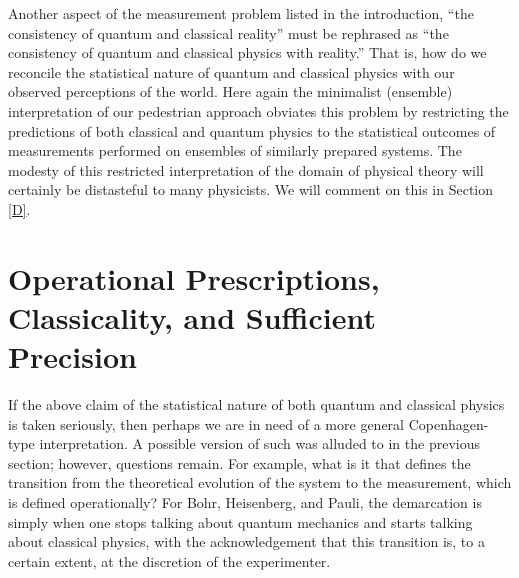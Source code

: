 \documentclass [12pt]{revtex4}
\begin{document}
Another aspect of the measurement problem listed in the
introduction, ``the consistency of quantum and classical reality''
must be rephrased as ``the consistency of quantum and classical
physics with reality.'' That is, how do we reconcile the statistical
nature of quantum and classical physics with our observed
perceptions of the world. Here again the minimalist (ensemble)
interpretation of our pedestrian approach obviates this problem by
restricting the predictions of both classical and quantum physics to
the statistical outcomes of measurements performed on ensembles of
similarly prepared systems. The modesty of this restricted
interpretation of the domain of physical theory will certainly be
distasteful to many physicists. We will comment on this in Section \ref{D}.

\section{Operational Prescriptions, Classicality, and Sufficient Precision} \label{Ope}

If the above claim of the statistical nature of both quantum and
classical physics is taken seriously, then perhaps we are in need of
a more general Copenhagen-type interpretation. A possible version of
such was alluded to in the previous section; however, questions
remain. For example, what is it that defines the transition from the
theoretical evolution of the system to the measurement, which is
defined operationally? For Bohr, Heisenberg, and Pauli, the
demarcation is simply when one stops talking about quantum mechanics
and starts talking about classical physics, with the acknowledgement
that this transition is, to a certain extent, at the discretion of
the experimenter.
\end{document}
